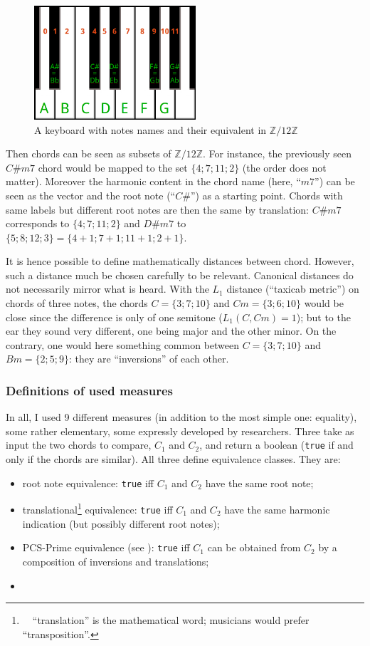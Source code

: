 \documentclass[a4paper,10pt]{article}
\newcommand{\guill}[1]{``#1''}
\begin{document}
\begin{figure}
\centering
\includegraphics[width=6cm]{images/keyboard+.jpg}
\caption{A keyboard with notes names and their equivalent in $\mathbb{Z}/12\mathbb{Z}$\label{keyboard}}
\end{figure}

Then chords can be seen as subsets of $\mathbb{Z}/12\mathbb{Z}$. For instance, the previously seen $C\#m7$ chord would be mapped to the set $\{4;7;11;2\}$ (the order does not matter). Moreover the harmonic content in the chord name (here, \guill{$m7$}) can be seen as the vector and the root note (\guill{$C\#$}) as a starting point. Chords with same labels but different root notes are then the same by translation: $C\#m7$ corresponds to $\{4;7;11;2\}$ and $D\#m7$ to $\{5;8;12;3\}=\{4+1;7+1;11+1;2+1\}$.

It is hence possible to define mathematically distances between chord. However, such a distance much be chosen carefully to be relevant. Canonical distances do not necessarily mirror what is heard. With the $L_1$ distance (\guill{taxicab metric}) on chords of three notes, the chords $C=\{3;7;10\}$ and $Cm=\{3;6;10\}$ would be close since the difference is only of one semitone ($L_1(C,Cm)=1$); but to the ear they sound very different, one being major and the other minor. On the contrary, one would here something common between $C=\{3;7;10\}$ and $Bm=\{2;5;9\}$: they are \guill{inversions} of each other.


\subsubsection{Definitions of used measures}

In all, I used 9 different measures (in addition to the most simple one: equality), some rather elementary, some expressly developed by researchers. Three take as input the two chords to compare, $C_1$ and $C_2$, and return a boolean (\texttt{true} if and only if the chords are similar). All three define equivalence classes. They are:
\begin{itemize}
\item root note equivalence: \texttt{true} iff $C_1$ and $C_2$ have the same root note;
\item translational\footnote{~~\guill{translation} is the mathematical word; musicians would prefer \guill{transposition}.} 
equivalence: \texttt{true} iff $C_1$ and $C_2$ have the same harmonic indication (but possibly different root notes);
\item PCS-Prime equivalence (see \cite{forte}): \texttt{true} iff $C_1$ can be obtained from $C_2$ by a composition of inversions and translations;
\item 
\end{itemize}
\end{document}

